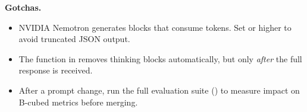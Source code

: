 \medskip\noindent\textbf{Gotchas.}

\begin{itemize}
    \item NVIDIA Nemotron generates  blocks that
          consume tokens.  Set  or higher to avoid
          truncated JSON output.
    \item The  function in
           removes thinking blocks
          automatically, but only \emph{after} the full response is
          received.
    \item After a prompt change, run the full evaluation suite
          () to measure impact on
          B-cubed metrics before merging.
\end{itemize}
